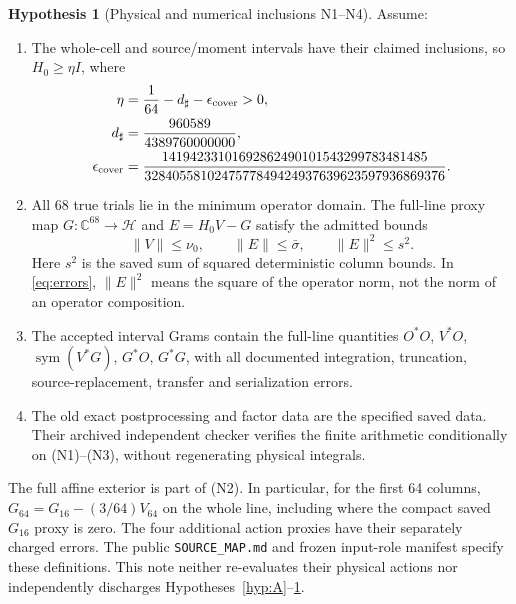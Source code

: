 \documentclass[11pt,a4paper]{article}
\newcommand{\C}{\mathbb C}
\newcommand{\HH}{\mathcal H}
\newcommand{\Id}{I}
\newcommand{\sym}{\operatorname{sym}}
\newcommand{\norm}[1]{\lVert #1\rVert}
\theoremstyle{definition}
\newtheorem{hypothesis}[theorem]{Hypothesis}
\theoremstyle{remark}
\numberwithin{equation}{section}
\begin{document}
\begin{hypothesis}[Physical and numerical inclusions N1--N4]\label{hyp:N}
Assume:
\begin{enumerate}
\item[(N1)] The whole-cell and source/moment intervals have their claimed
inclusions, so \(H_0\ge\eta\Id\), where
\begin{equation}\label{eq:eta}
 \begin{split}
 \eta&=\frac1{64}-d_\sharp-\epsilon_{\rm cover}>0,\\
 d_\sharp&=\frac{960589}{4389760000000},\\
 \epsilon_{\rm cover}
 &=\frac{14194233101692862490101543299783481485}
 {3284055810247577849424937639623597936869376}.
 \end{split}
\end{equation}
\item[(N2)] All 68 true trials lie in the minimum operator domain.
The full-line proxy map \(G:\C^{68}\to\HH\) and
\(E=H_0V-G\) satisfy the admitted bounds
\begin{equation}\label{eq:errors}
 \norm V\le\nu_0,\qquad \norm E\le\bar\sigma,\qquad
 \norm{E}^2\le s^2.
\end{equation}
Here \(s^2\) is the saved sum of squared deterministic column bounds.
In \eqref{eq:errors}, \(\norm{E}^2\) means the square of the operator norm,
not the norm of an operator composition.
\item[(N3)] The accepted interval Grams contain the full-line quantities
\(O^*O\), \(V^*O\), \(\sym(V^*G)\), \(G^*O\), \(G^*G\), with all documented integration,
truncation, source-replacement, transfer and serialization errors.
\item[(N4)] The old exact postprocessing and factor data are the specified
saved data. Their archived independent checker verifies the finite
arithmetic conditionally on (N1)--(N3), without regenerating physical integrals.
\end{enumerate}
\end{hypothesis}

The full affine exterior is part of (N2). In particular, for the first
64 columns, \(G_{64}=G_{16}-(3/64)V_{64}\) on the whole line, including
where the compact saved \(G_{16}\) proxy is zero.
The four additional action proxies have their separately charged errors.
The public \texttt{SOURCE\_MAP.md} and frozen input-role manifest specify
these definitions. This note neither re-evaluates their physical actions
nor independently discharges Hypotheses~\ref{hyp:A}--\ref{hyp:N}.
\end{document}
